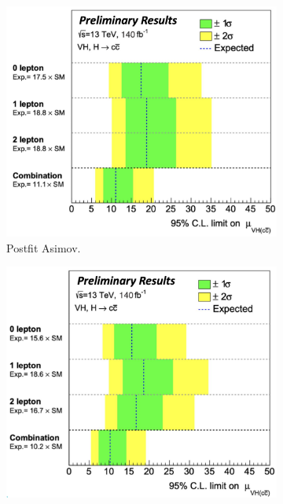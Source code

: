 \begin{figure}[h!]
    \centering
    \begin{subfigure}[b]{0.48\textwidth}
        \centering
        \includegraphics[width=\textwidth]{Images/VH/Fit/fromSlides/postfitVHcc.png}
        \caption{Postfit Asimov.}
        \label{fig:fit_new_vhcclimitPostfit}
    \end{subfigure}
    \begin{subfigure}[b]{0.48\textwidth}
      \centering
      \includegraphics[width=\textwidth]{Images/VH/Fit/fromSlides/prefitVHcc.png}

\end{subfigure}
\end{figure}
